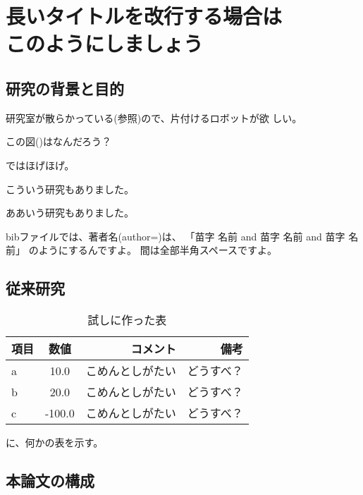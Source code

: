 \chapter[長いタイトルを改行する場合はこのようにしましょう(見出し用)]%
        {長いタイトルを改行する場合は\\このようにしましょう}



        \section{研究の背景と目的}

        研究室が散らかっている(参照)ので、片付けるロボットが欲
        しい。

        この図()はなんだろう？

        ではほげほげ。

        こういう研究\cite{Hondo:JRSJ2011}もありました。

        ああいう研究\cite{Hondo:JRSJ2011}もありました。

        bibファイルでは、著者名(author=)は、
        「苗字 名前 and 苗字 名前 and 苗字 名前」
        のようにするんですよ\cite{Hondo:JRSJ2011}。
        間は全部半角スペースですよ。

        \section{従来研究}

        \begin{table}[tb]
          \begin{center}
            \caption{試しに作った表}
            \begin{tabular}{l|c|r|r}
              \hline
              項目 & 数値 & コメント & 備考 \\
              \hline
              a & 10.0 & こめんとしがたい & どうすべ？\\
              b & 20.0 & こめんとしがたい & どうすべ？\\
              c & -100.0 & こめんとしがたい & どうすべ？\\
              \hline
            \end{tabular}
          \end{center}
        \end{table}

        に、何かの表を示す。

        \section{本論文の構成}
